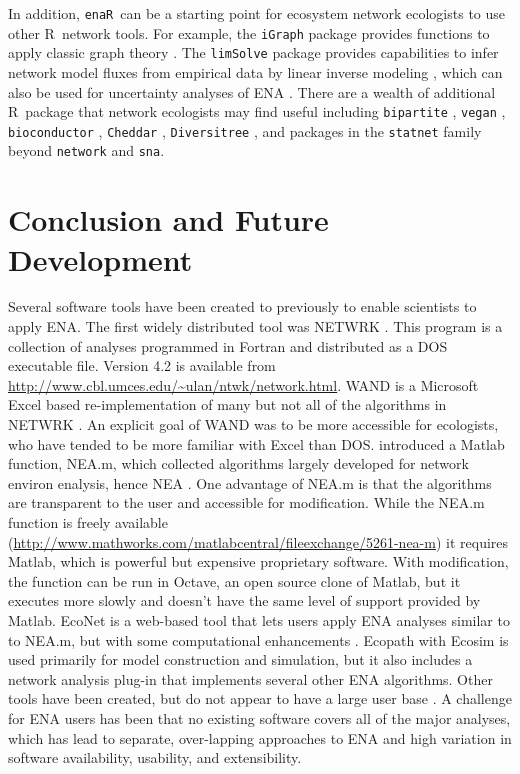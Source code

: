 \documentclass[11pt]{article}
\newcommand{\R}{R}
\newcommand{\enaR}{\texttt{enaR}}
\begin{document}
\begin{spacing}{2}
In addition, \enaR\ can be a starting point for ecosystem network
ecologists to use other \R\ network tools.  For example, the
\texttt{iGraph} package provides functions to apply classic graph
theory \citep{csardi06}.  The \texttt{limSolve} package provides
capabilities to infer network model fluxes from empirical data by
linear inverse modeling \citep{soetaert09}, which can also be used for
uncertainty analyses of ENA \citep{kones09}. There are a wealth of
additional \R\ package that network ecologists may find useful
including \texttt{bipartite} \citep{dormann2008}, \texttt{vegan}
\citep{dixon2003vegan}, \texttt{bioconductor}
\citep{gentleman2004bioconductor}, \texttt{Cheddar}
\citep{hudson2013}, \texttt{Diversitree} \citep{fitzjohn2012}, and
packages in the \texttt{statnet} family \citep{handcock2008statnet}
beyond \texttt{network} and \texttt{sna}.

\section{Conclusion and Future Development}
Several software tools have been created to previously to enable
scientists to apply ENA. The first widely distributed tool was NETWRK
\citep{ulanowicz91}.  This program is a collection of analyses
programmed in Fortran and distributed as a DOS executable
file. Version 4.2 is available from
\url{http://www.cbl.umces.edu/~ulan/ntwk/network.html}. WAND is a
Microsoft Excel based re-implementation of many but not all of the
algorithms in NETWRK \citep{allesina04_wand}. An explicit goal of WAND
was to be more accessible for ecologists, who have tended to be more
familiar with Excel than DOS.  \citet{fath06} introduced a Matlab
function, NEA.m, which collected algorithms largely developed for
network environ enalysis, hence NEA \citep{patten91}.  One advantage
of NEA.m is that the algorithms are transparent to the user and
accessible for modification.  While the NEA.m function is freely
available
(\url{http://www.mathworks.com/matlabcentral/fileexchange/5261-nea-m})
it requires Matlab, which is powerful but expensive proprietary
software.  With modification, the function can be run in Octave, an
open source clone of Matlab, but it executes more slowly and doesn't
have the same level of support provided by Matlab.  EcoNet is a
web-based tool that lets users apply ENA analyses similar to to NEA.m,
but with some computational enhancements \citep{kazanci07,
  schramski11}.  Ecopath with Ecosim \citep{christensen92,
  christensen04} is used primarily for model construction and
simulation, but it also includes a network analysis plug-in that
implements several other ENA algorithms.  Other tools have been
created, but do not appear to have a large user base
\citep{latham2006,kones09}. A challenge for ENA users has been that no
existing software covers all of the major analyses, which has lead to
separate, over-lapping approaches to ENA and high variation in
software availability, usability, and extensibility.


\end{spacing}
\end{document}

